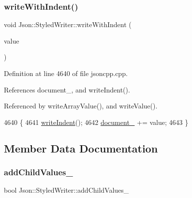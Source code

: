 \mbox{\label{class_json_1_1_styled_writer_ac38e02972054125c38efbe327b52f6ac}} 
\subsubsection{\texorpdfstring{write\+With\+Indent()}{writeWithIndent()}}
{\footnotesize\ttfamily void Json\+::\+Styled\+Writer\+::write\+With\+Indent (\begin{DoxyParamCaption}\item[{const \hyperlink{json_8h_a1e723f95759de062585bc4a8fd3fa4be}{J\+S\+O\+N\+C\+P\+P\+\_\+\+S\+T\+R\+I\+NG} \&}]{value }\end{DoxyParamCaption})\hspace{0.3cm}{\ttfamily [private]}}



Definition at line 4640 of file jsoncpp.\+cpp.



References document\+\_\+, and write\+Indent().



Referenced by write\+Array\+Value(), and write\+Value().


\begin{DoxyCode}
4640                                                               \{
4641   \hyperlink{class_json_1_1_styled_writer_a885f4bfb5701896d60eee6716d2db7e4}{writeIndent}();
4642   \hyperlink{class_json_1_1_styled_writer_ae967b0c77e4d7cb889ce7b6ee4ce28d7}{document\_} += value;
4643 \}
\end{DoxyCode}


\subsection{Member Data Documentation}
\mbox{\label{class_json_1_1_styled_writer_acaabfa48b50a8bb7fa9ce98e2ae971d9}} 
\subsubsection{\texorpdfstring{add\+Child\+Values\+\_\+}{addChildValues\_}}
{\footnotesize\ttfamily bool Json\+::\+Styled\+Writer\+::add\+Child\+Values\+\_\+\hspace{0.3cm}{\ttfamily [private]}}



